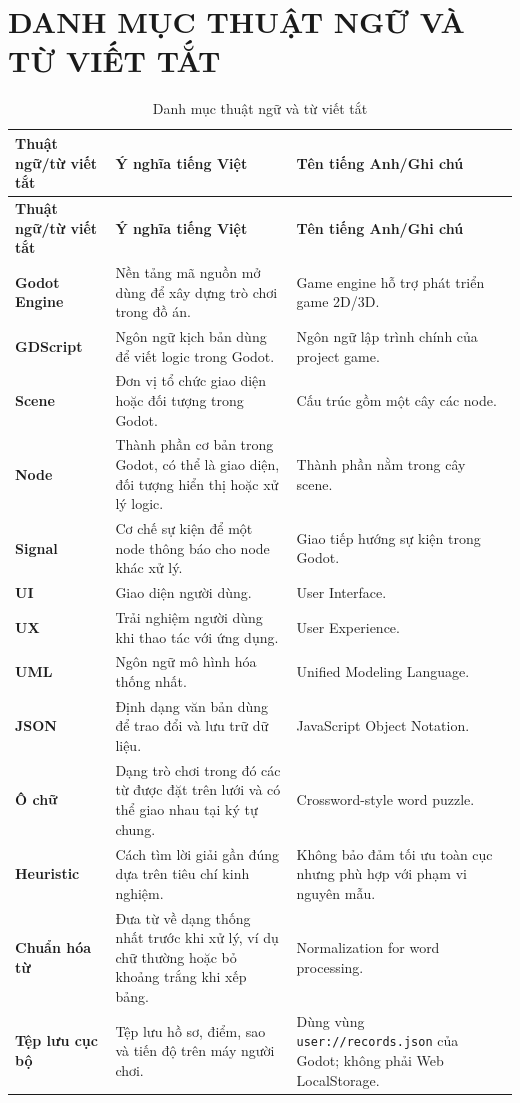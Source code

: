 \documentclass[../DoAn.tex]{subfiles}
\begin{document}
\section*{DANH MỤC THUẬT NGỮ VÀ TỪ VIẾT TẮT}

{\small
\setlength{\LTleft}{0pt}
\setlength{\LTright}{0pt}
\begin{longtable}{|>{\RaggedRight\arraybackslash}p{3.2cm}|>{\RaggedRight\arraybackslash}p{5.3cm}|>{\RaggedRight\arraybackslash}p{5.2cm}|}
\caption{Danh mục thuật ngữ và từ viết tắt}
\label{table:terms_acronyms}\\
\hline
\textbf{Thuật ngữ/từ viết tắt} & \textbf{Ý nghĩa tiếng Việt} & \textbf{Tên tiếng Anh/Ghi chú} \\ \hline
\endfirsthead
\hline
\textbf{Thuật ngữ/từ viết tắt} & \textbf{Ý nghĩa tiếng Việt} & \textbf{Tên tiếng Anh/Ghi chú} \\ \hline
\endhead
\textbf{Godot Engine} & Nền tảng mã nguồn mở dùng để xây dựng trò chơi trong đồ án. & Game engine hỗ trợ phát triển game 2D/3D. \\ \hline
\textbf{GDScript} & Ngôn ngữ kịch bản dùng để viết logic trong Godot. & Ngôn ngữ lập trình chính của project game. \\ \hline
\textbf{Scene} & Đơn vị tổ chức giao diện hoặc đối tượng trong Godot. & Cấu trúc gồm một cây các node. \\ \hline
\textbf{Node} & Thành phần cơ bản trong Godot, có thể là giao diện, đối tượng hiển thị hoặc xử lý logic. & Thành phần nằm trong cây scene. \\ \hline
\textbf{Signal} & Cơ chế sự kiện để một node thông báo cho node khác xử lý. & Giao tiếp hướng sự kiện trong Godot. \\ \hline
\textbf{UI} & Giao diện người dùng. & User Interface. \\ \hline
\textbf{UX} & Trải nghiệm người dùng khi thao tác với ứng dụng. & User Experience. \\ \hline
\textbf{UML} & Ngôn ngữ mô hình hóa thống nhất. & Unified Modeling Language. \\ \hline
\textbf{JSON} & Định dạng văn bản dùng để trao đổi và lưu trữ dữ liệu. & JavaScript Object Notation. \\ \hline
\textbf{Ô chữ} & Dạng trò chơi trong đó các từ được đặt trên lưới và có thể giao nhau tại ký tự chung. & Crossword-style word puzzle. \\ \hline
\textbf{Heuristic} & Cách tìm lời giải gần đúng dựa trên tiêu chí kinh nghiệm. & Không bảo đảm tối ưu toàn cục nhưng phù hợp với phạm vi nguyên mẫu. \\ \hline
\textbf{Chuẩn hóa từ} & Đưa từ về dạng thống nhất trước khi xử lý, ví dụ chữ thường hoặc bỏ khoảng trắng khi xếp bảng. & Normalization for word processing. \\ \hline
\textbf{Tệp lưu cục bộ} & Tệp lưu hồ sơ, điểm, sao và tiến độ trên máy người chơi. & Dùng vùng \texttt{user://records.json} của Godot; không phải Web LocalStorage. \\ \hline
\end{longtable}
}
\end{document}
